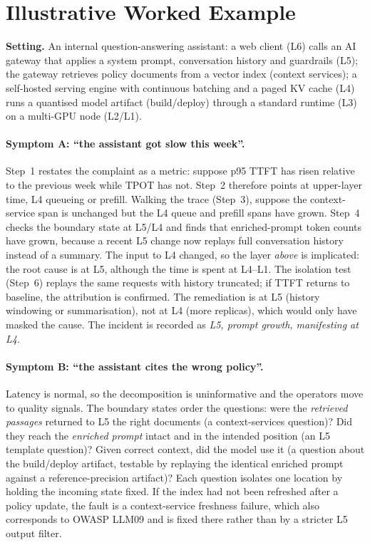 \documentclass[11pt]{article}
\begin{document}
\section{Illustrative Worked Example}
\label{sec:case}

\noindent{}

\medskip
\noindent\textbf{Setting.} An internal question-answering assistant: a web client (L6) calls an AI gateway that applies a system prompt, conversation history and guardrails (L5); the gateway retrieves policy documents from a vector index (context services); a self-hosted serving engine with continuous batching and a paged KV cache (L4) runs a quantised model artifact (build/deploy) through a standard runtime (L3) on a multi-GPU node (L2/L1).

\paragraph{Symptom A: ``the assistant got slow this week''.} Step~1 restates the complaint as a metric: suppose p95 TTFT has risen relative to the previous week while TPOT has not. Step~2 therefore points at upper-layer time, L4 queueing or prefill. Walking the trace (Step~3), suppose the context-service span is unchanged but the L4 queue and prefill spans have grown. Step~4 checks the boundary state at L5/L4 and finds that enriched-prompt token counts have grown, because a recent L5 change now replays full conversation history instead of a summary. The input to L4 changed, so the layer \emph{above} is implicated: the root cause is at L5, although the time is spent at L4--L1. The isolation test (Step~6) replays the same requests with history truncated; if TTFT returns to baseline, the attribution is confirmed. The remediation is at L5 (history windowing or summarisation), not at L4 (more replicas), which would only have masked the cause. The incident is recorded as \emph{L5, prompt growth, manifesting at L4}.

\paragraph{Symptom B: ``the assistant cites the wrong policy''.} Latency is normal, so the decomposition is uninformative and the operators move to quality signals. The boundary states order the questions: were the \emph{retrieved passages} returned to L5 the right documents (a context-services question)? Did they reach the \emph{enriched prompt} intact and in the intended position (an L5 template question)? Given correct context, did the model use it (a question about the build/deploy artifact, testable by replaying the identical enriched prompt against a reference-precision artifact)? Each question isolates one location by holding the incoming state fixed. If the index had not been refreshed after a policy update, the fault is a context-service freshness failure, which also corresponds to OWASP LLM09 and is fixed there rather than by a stricter L5 output filter.
\end{document}
